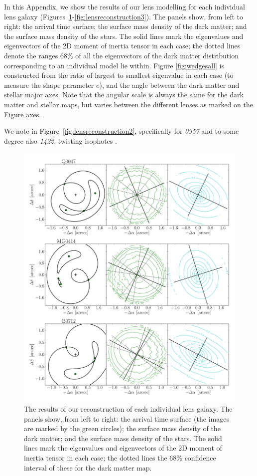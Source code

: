 \documentclass[useAMS,usenatbib]{mn2e}
\begin{document}
In this Appendix, we show the results of our lens modelling for each individual lens galaxy (Figures~\ref{fig:lensreconstruction1}-\ref{fig:lensreconstruction3}). The panels show, from left to right: the arrival time surface; the surface mass density of the dark matter; and the surface mass density of the stars. The solid lines mark the eigenvalues and eigenvectors of the 2D moment of inertia tensor in each case; the dotted lines denote the ranges 68\% of all the eigenvectors of the dark matter distribution corresponding to an individual model lie within. Figure \ref{fig:wedgesall} is constructed from the ratio of largest to smallest eigenvalue in each case (to measure the shape parameter $e$), and the angle between the dark matter and stellar major axes. Note that the angular scale is always the same for the dark matter and stellar maps, but varies between the different lenses as marked on the Figure axes.

We note in Figure~\ref{fig:lensreconstruction2}, specifically for {\it0957} and to some degree also {\it1422}, twisting isophotes \citep[e.g.][]{1978ComAp...8...27B}.

\begin{figure}
  \centering
  \includegraphics[width=.8\linewidth]{Figures/AllLenses31.pdf}
  \caption[width=.65\linewidth]{The results of our reconstruction of each individual lens galaxy. The panels show, from left to right: the arrival time surface (the images are marked by the green circles); the surface mass density of the dark matter; and the surface mass density of the stars. The solid lines mark the eigenvalues and eigenvectors of the 2D moment of inertia tensor in each case; the dotted lines the 68\% confidence interval of these for the dark matter map.}
  \label{fig:lensreconstruction1}
\end{figure}
\end{document}
